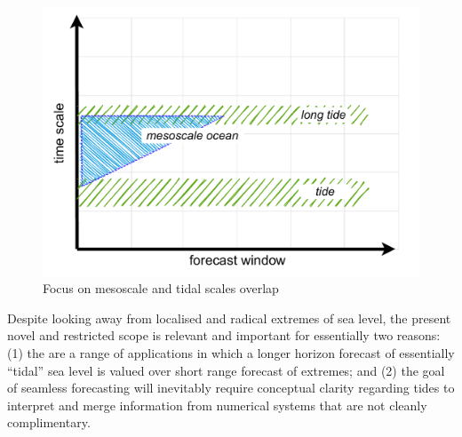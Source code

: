 \begin{figure}[!hbt]\centering
  \includegraphics[width=\figwidthBig]{figures/diagrams/scales_focus.pdf}
  \caption{Focus on mesoscale and tidal scales overlap}
  \label{fig:forecastScalesFocus}
\end{figure}

Despite looking away from localised and radical extremes of sea level, the present novel and restricted scope is relevant and important for essentially two  reasons: (1) the are a range of applications in which a longer horizon forecast of essentially ``tidal'' sea level is valued over short range forecast of extremes; and (2) the goal of seamless forecasting will inevitably require conceptual clarity regarding tides to interpret and merge information from numerical systems that are not cleanly complimentary. 

